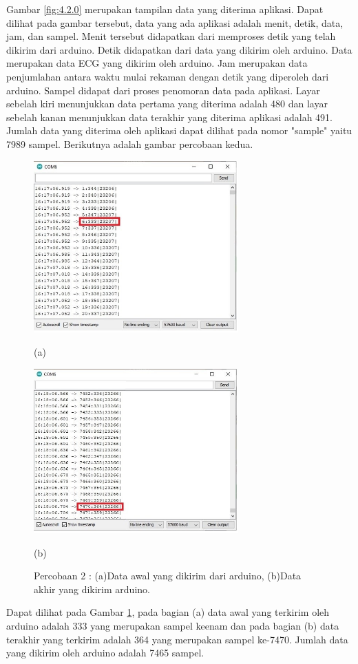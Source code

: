 \vspace{1ex}
Gambar \ref{fig:4.2.0} merupakan tampilan data yang diterima aplikasi. Dapat dilihat pada gambar tersebut, data yang ada aplikasi adalah menit, detik, data, jam, dan sampel. Menit tersebut didapatkan dari memproses detik yang telah dikirim dari arduino. Detik didapatkan dari data yang dikirim oleh arduino. Data merupakan data ECG yang dikirim oleh arduino. Jam merupakan data penjumlahan antara waktu mulai rekaman dengan detik yang diperoleh dari arduino. Sampel didapat dari proses penomoran data pada aplikasi.  Layar sebelah kiri menunjukkan data pertama yang diterima adalah 480 dan layar sebelah kanan menunjukkan data terakhir yang diterima aplikasi adalah 491. Jumlah data yang diterima oleh aplikasi dapat dilihat pada nomor "sample" yaitu 7989 sampel. Berikutnya adalah gambar percobaan kedua. 
\begin{figure}[H] \centering
	\includegraphics[width=0.7\textwidth]{img/percob/Slide3}
	
	(a)
	
	\includegraphics[width=0.7\textwidth]{img/percob/Slide4}
	
	(b)
	
	\caption{Percobaan 2 : (a)Data awal yang dikirim dari arduino, (b)Data akhir yang dikirim arduino.}
	\label{fig:4.2.1}
\end{figure}
\vspace{1ex}
Dapat dilihat pada Gambar \ref{fig:4.2.1}, pada bagian (a) data awal yang terkirim oleh arduino adalah 333 yang merupakan sampel keenam dan pada bagian (b) data terakhir yang terkirim adalah 364 yang merupakan sampel ke-7470. Jumlah data yang dikirim oleh arduino adalah 7465 sampel.

